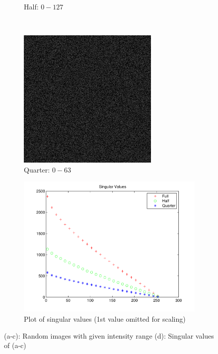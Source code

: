 \documentclass{report}
\begin{document}
\begin{figure}[H]
\begin{subfigure}[b]{0.2\textwidth}
        		\caption{Half: $0-127$}
        \end{subfigure}
        ~~~
        \begin{subfigure}[b]{0.2\textwidth}
                \includegraphics[width=\textwidth]{graphics/randomBottomQuarterSpace.png}
                \caption{Quarter: $0-63$}
        \end{subfigure}

        \begin{subfigure}[b]{0.6\textwidth}
                \includegraphics[width=\textwidth]{graphics/singular_values_color_space.pdf}
                \caption{Plot of singular values (1st value omitted for scaling)}
        \end{subfigure}
        \caption{(a-c): Random images with given intensity range (d): Singular values of (a-c)}
        \label{fig:rand_images}
\end{figure}
\end{document}
